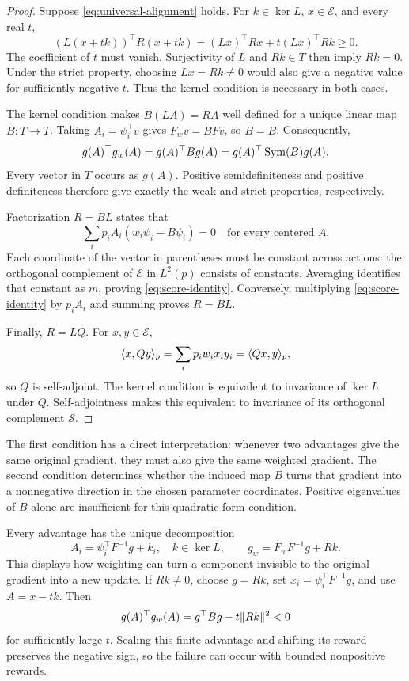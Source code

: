 \begin{proof}
Suppose \eqref{eq:universal-alignment} holds. For $k\in\ker L$, $x\in\mathcal E$, and every real $t$,
\[
(L(x+tk))^\top R(x+tk)=(Lx)^\top Rx+t(Lx)^\top Rk\ge0.
\]
The coefficient of $t$ must vanish. Surjectivity of $L$ and $Rk\in T$ then imply $Rk=0$. Under the strict property, choosing $Lx=Rk\ne0$ would also give a negative value for sufficiently negative $t$. Thus the kernel condition is necessary in both cases.

The kernel condition makes $\widetilde B(LA)=RA$ well defined for a unique linear map $\widetilde B:T\to T$. Taking $A_i=\psi_i^\top v$ gives $F_wv=\widetilde BFv$, so $\widetilde B=B$. Consequently,
\[
g(A)^\top g_w(A)=g(A)^\top Bg(A)=g(A)^\top\operatorname{Sym}(B)g(A).
\]
Every vector in $T$ occurs as $g(A)$. Positive semidefiniteness and positive definiteness therefore give exactly the weak and strict properties, respectively.

Factorization $R=BL$ states that
\[
\sum_i p_iA_i(w_i\psi_i-B\psi_i)=0\quad\text{for every centered }A.
\]
Each coordinate of the vector in parentheses must be constant across actions: the orthogonal complement of $\mathcal E$ in $L^2(p)$ consists of constants. Averaging identifies that constant as $m$, proving \eqref{eq:score-identity}. Conversely, multiplying \eqref{eq:score-identity} by $p_iA_i$ and summing proves $R=BL$.

Finally, $R=LQ$. For $x,y\in\mathcal E$,
\[
\langle x,Qy\rangle_p=\sum_i p_iw_ix_iy_i=\langle Qx,y\rangle_p,
\]
so $Q$ is self-adjoint. The kernel condition is equivalent to invariance of $\ker L$ under $Q$. Self-adjointness makes this equivalent to invariance of its orthogonal complement $\mathcal S$.
\end{proof}

The first condition has a direct interpretation: whenever two advantages give the same original gradient, they must also give the same weighted gradient. The second condition determines whether the induced map $B$ turns that gradient into a nonnegative direction in the chosen parameter coordinates. Positive eigenvalues of $B$ alone are insufficient for this quadratic-form condition.

Every advantage has the unique decomposition
\begin{equation}
A_i=\psi_i^\top F^{-1}g+k_i,\quad k\in\ker L,
\qquad
g_w=F_wF^{-1}g+Rk.
\label{eq:gradient-decomposition}
\end{equation}
This displays how weighting can turn a component invisible to the original gradient into a new update. If $Rk\ne0$, choose $g=Rk$, set $x_i=\psi_i^\top F^{-1}g$, and use $A=x-tk$. Then
\[
g(A)^\top g_w(A)=g^\top Bg-t\lVert Rk\rVert^2<0
\]
for sufficiently large $t$. Scaling this finite advantage and shifting its reward preserves the negative sign, so the failure can occur with bounded nonpositive rewards.

